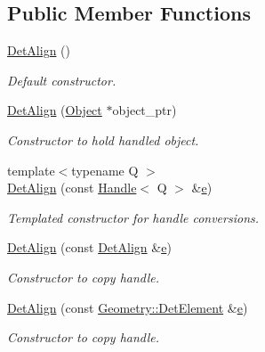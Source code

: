 \subsection*{Public Member Functions}
\begin{DoxyCompactItemize}
\item 
\hyperlink{class_d_d4hep_1_1_alignments_1_1_det_align_a32f656225a62fa9b6b789464bfea22b3}{Det\+Align} ()
\begin{DoxyCompactList}\small\item\em Default constructor. \end{DoxyCompactList}\item 
\hyperlink{class_d_d4hep_1_1_alignments_1_1_det_align_a8b7b85c54d99bcc7e3f0535a4833780e}{Det\+Align} (\hyperlink{class_d_d4hep_1_1_alignments_1_1_det_align_ae49c039feb46ce85c64fecb6cf669f45}{Object} $\ast$object\+\_\+ptr)
\begin{DoxyCompactList}\small\item\em Constructor to hold handled object. \end{DoxyCompactList}\item 
{\footnotesize template$<$typename Q $>$ }\\\hyperlink{class_d_d4hep_1_1_alignments_1_1_det_align_a51eaf73691c55dc1e6e925e3db4bd5c2}{Det\+Align} (const \hyperlink{class_d_d4hep_1_1_handle}{Handle}$<$ Q $>$ \&\hyperlink{_volumes_8cpp_a8a9a1f93e9b09afccaec215310e64142}{e})
\begin{DoxyCompactList}\small\item\em Templated constructor for handle conversions. \end{DoxyCompactList}\item 
\hyperlink{class_d_d4hep_1_1_alignments_1_1_det_align_ac322b60733704c92ed78a405f4c2b997}{Det\+Align} (const \hyperlink{class_d_d4hep_1_1_alignments_1_1_det_align}{Det\+Align} \&\hyperlink{_volumes_8cpp_a8a9a1f93e9b09afccaec215310e64142}{e})
\begin{DoxyCompactList}\small\item\em Constructor to copy handle. \end{DoxyCompactList}\item 
\hyperlink{class_d_d4hep_1_1_alignments_1_1_det_align_acb573b6c89a9e18bc272e8b1f2db3ea3}{Det\+Align} (const \hyperlink{class_d_d4hep_1_1_geometry_1_1_det_element}{Geometry\+::\+Det\+Element} \&\hyperlink{_volumes_8cpp_a8a9a1f93e9b09afccaec215310e64142}{e})
\begin{DoxyCompactList}\small\item\em Constructor to copy handle. \end{DoxyCompactList}\item 

\end{DoxyCompactItemize}
